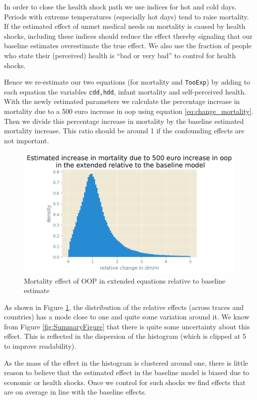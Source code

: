 \documentclass[a4paper,12pt]{article}
\begin{document}
In order to close the health shock path we use indices for hot and cold days. Periods with extreme temperatures (especially hot days) tend to raise mortality. If the estimated effect of unmet medical needs on mortality is caused by health shocks, including these indices should reduce the effect thereby signaling that our baseline estimates overestimate the true effect. We also use the fraction of people who state their (perceived) health is ``bad or very bad'' to control for health shocks.

Hence we re-estimate our two equations (for mortality and \texttt{TooExp}) by adding to each equation the variables \texttt{cdd,hdd}, infant mortality and self-perceived health. With the newly estimated parameters we calculate the percentage increase in mortality due to a 500 euro increase in oop using equation \eqref{eq:change_mortality}. Then we divide this percentage increase in mortality by the baseline estimated mortality increase. This ratio should be around 1 if the confounding effects are not important.


\begin{figure}[htbp]
\centering
\includegraphics[width=.9\linewidth]{./figures/histogram_colliders.png}
\caption{\label{fig:hist_colliders}Mortality effect of OOP in extended equations relative to baseline estimate}
\end{figure}

As shown in Figure \ref{fig:hist_colliders}, the distribution of the relative effects (across traces and countries) has a mode close to one and quite some variation around it. We know from Figure \ref{fig:SummaryFigure} that there is quite some uncertainty about this effect. This is reflected in the dispersion of the histogram (which is clipped at 5 to improve readability). 

As the mass of the effect in the histogram is clustered around one, there is little reason to believe that the estimated effect in the baseline model is biased due to economic or health shocks. Once we control for such shocks we find effects that are on average in line with the baseline effects. 
\end{document}
